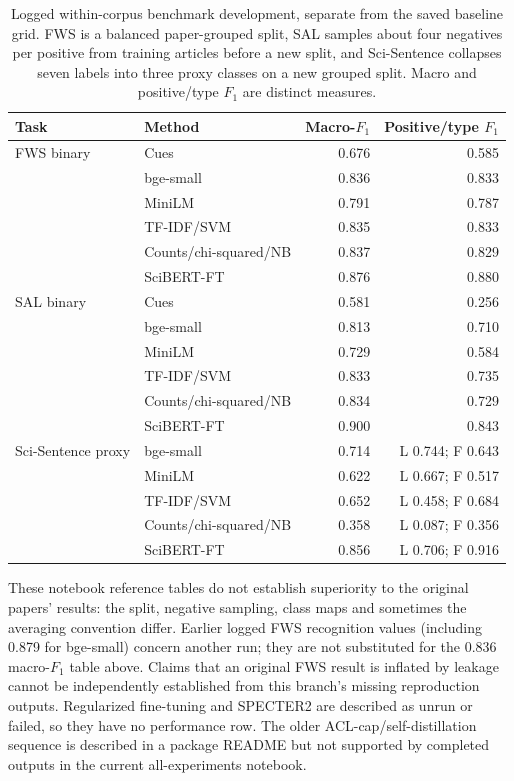 \begin{table}[H]
\centering\small
\caption{Logged within-corpus benchmark development, separate from the saved baseline grid.
FWS is a balanced paper-grouped split, SAL samples about four negatives per positive from
training articles before a new split, and Sci-Sentence collapses seven labels into three proxy
classes on a new grouped split. Macro and positive/type $F_1$ are distinct measures.}
\label{T:within-corpus}
\begin{tabular}{@{}llrr@{}}
\toprule
Task & Method & Macro-$F_1$ & Positive/type $F_1$ \\
\midrule
FWS binary & Cues & 0.676 & 0.585 \\
 & bge-small & 0.836 & 0.833 \\
 & MiniLM & 0.791 & 0.787 \\
 & TF-IDF/SVM & 0.835 & 0.833 \\
 & Counts/chi-squared/NB & 0.837 & 0.829 \\
 & SciBERT-FT & 0.876 & 0.880 \\
\midrule
SAL binary & Cues & 0.581 & 0.256 \\
 & bge-small & 0.813 & 0.710 \\
 & MiniLM & 0.729 & 0.584 \\
 & TF-IDF/SVM & 0.833 & 0.735 \\
 & Counts/chi-squared/NB & 0.834 & 0.729 \\
 & SciBERT-FT & 0.900 & 0.843 \\
\midrule
Sci-Sentence proxy & bge-small & 0.714 & L 0.744; F 0.643 \\
 & MiniLM & 0.622 & L 0.667; F 0.517 \\
 & TF-IDF/SVM & 0.652 & L 0.458; F 0.684 \\
 & Counts/chi-squared/NB & 0.358 & L 0.087; F 0.356 \\
 & SciBERT-FT & 0.856 & L 0.706; F 0.916 \\
\bottomrule
\end{tabular}
\end{table}

These notebook reference tables do not establish superiority to the original papers' results:
the split, negative sampling, class maps and sometimes the averaging convention differ.
Earlier logged FWS recognition values (including 0.879 for bge-small) concern another run;
they are not substituted for the 0.836 macro-$F_1$ table above. Claims that an original FWS
result is inflated by leakage cannot be independently established from this branch's missing
reproduction outputs. Regularized fine-tuning and SPECTER2 are described as unrun or failed,
so they have no performance row. The older ACL-cap/self-distillation sequence is described in
a package README but not supported by completed outputs in the current all-experiments notebook.

